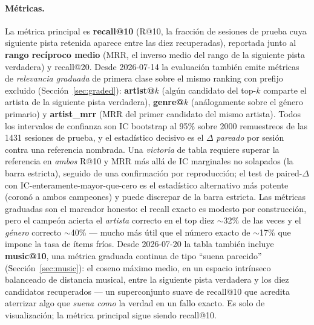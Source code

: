 \documentclass[11pt]{article}
\begin{document}
\paragraph{Métricas.} La métrica principal es \textbf{recall@10} (R@10, la
fracción de sesiones de prueba cuya siguiente pista retenida aparece entre las
diez recuperadas), reportada junto al \textbf{rango recíproco medio} (MRR, el
inverso medio del rango de la siguiente pista verdadera) y recall@20. Desde
2026-07-14 la evaluación también emite métricas de \emph{relevancia graduada}
de primera clase sobre el mismo ranking con prefijo excluido
(Sección~\ref{sec:graded}): \textbf{artist@$k$} (algún candidato del top-$k$
comparte el artista de la siguiente pista verdadera), \textbf{genre@$k$}
(análogamente sobre el género primario) y \textbf{artist\_mrr} (MRR del primer
candidato del mismo artista). Todos los intervalos de confianza son IC bootstrap
al 95\% sobre \num{2000} remuestreos de las \num{1431} sesiones de prueba, y el
estadístico decisivo es el $\Delta$ \emph{pareado} por sesión contra una
referencia nombrada. Una \emph{victoria} de tabla requiere superar la
referencia en \emph{ambos} R@10 y MRR más allá de IC marginales no solapados
(la barra estricta), seguido de una confirmación por reproducción; el test de
paired-$\Delta$ con IC-enteramente-mayor-que-cero es el estadístico alternativo
más potente (coronó a ambos campeones) y puede discrepar de la barra estricta.
Las métricas graduadas son el marcador honesto: el recall exacto es modesto por
construcción, pero el campeón acierta el \emph{artista} correcto en el top diez
$\sim$32\% de las veces y el \emph{género} correcto $\sim$40\% --- mucho más
útil que el número exacto de $\sim$17\% que impone la tasa de ítems fríos. Desde
2026-07-20 la tabla también incluye \textbf{music@10}, una métrica graduada
continua de tipo ``suena parecido'' (Sección~\ref{sec:music}): el coseno máximo
medio, en un espacio intrínseco balanceado de distancia musical, entre la
siguiente pista verdadera y los diez candidatos recuperados --- un superconjunto
suave de recall@10 que acredita aterrizar algo que \emph{suena como} la verdad en
un fallo exacto. Es solo de visualización; la métrica principal sigue siendo
recall@10.
\end{document}
